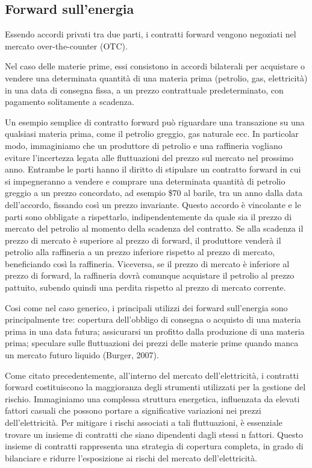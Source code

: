 \documentclass[12pt,a4paper]{report}
\begin{document}
\subsection{Forward sull'energia}

Essendo accordi privati tra due parti, i contratti forward vengono negoziati nel mercato over-the-counter (OTC). 

Nel caso delle materie prime, essi consistono in accordi bilaterali per acquistare o vendere una determinata quantità di una materia prima (petrolio, gas, elettricità) in una data di consegna fissa, a un prezzo contrattuale predeterminato, con pagamento solitamente a scadenza.

Un esempio semplice di contratto forward può riguardare una transazione su una qualsiasi materia prima, come il petrolio greggio, gas naturale ecc. In particolar modo, immaginiamo che un produttore di petrolio e una raffineria vogliano evitare l'incertezza legata alle fluttuazioni del prezzo sul mercato nel prossimo anno. Entrambe le parti hanno il diritto di stipulare un contratto forward in cui si impegneranno a vendere e comprare una determinata quantità di petrolio greggio a un prezzo concordato, ad esempio \$70 al barile, tra un anno dalla data dell'accordo, fissando così un prezzo invariante. Questo accordo è vincolante e le parti sono obbligate a rispettarlo, indipendentemente da quale sia il prezzo di mercato del petrolio al momento della scadenza del contratto. Se alla scadenza il prezzo di mercato è superiore al prezzo di forward, il produttore venderà il petrolio alla raffineria a un prezzo inferiore rispetto al prezzo di mercato, beneficiando così la raffineria. Viceversa, se il prezzo di mercato è inferiore al prezzo di forward, la raffineria dovrà comunque acquistare il petrolio al prezzo pattuito, subendo quindi una perdita rispetto al prezzo di mercato corrente.

Cosi come nel caso generico, i principali utilizzi dei forward sull'energia sono principalmente tre: copertura dell'obbligo di consegna o acquisto di una materia prima in una data futura; assicurarsi un profitto dalla produzione di una materia prima; speculare sulle fluttuazioni dei prezzi delle materie prime quando manca un mercato futuro liquido (Burger, 2007).

Come citato precedentemente, all'interno del mercato dell'elettricità, i contratti forward costituiscono la maggioranza degli strumenti utilizzati per la gestione del rischio.  Immaginiamo una complessa struttura energetica, influenzata da elevati fattori casuali che possono portare a significative variazioni nei prezzi dell'elettricità. Per mitigare i rischi associati a tali fluttuazioni, è essenziale trovare un insieme di contratti che siano dipendenti dagli stessi n fattori. Questo insieme di contratti rappresenta una strategia di copertura completa, in grado di bilanciare e ridurre l'esposizione ai rischi del mercato dell'elettricità. 
\end{document}
